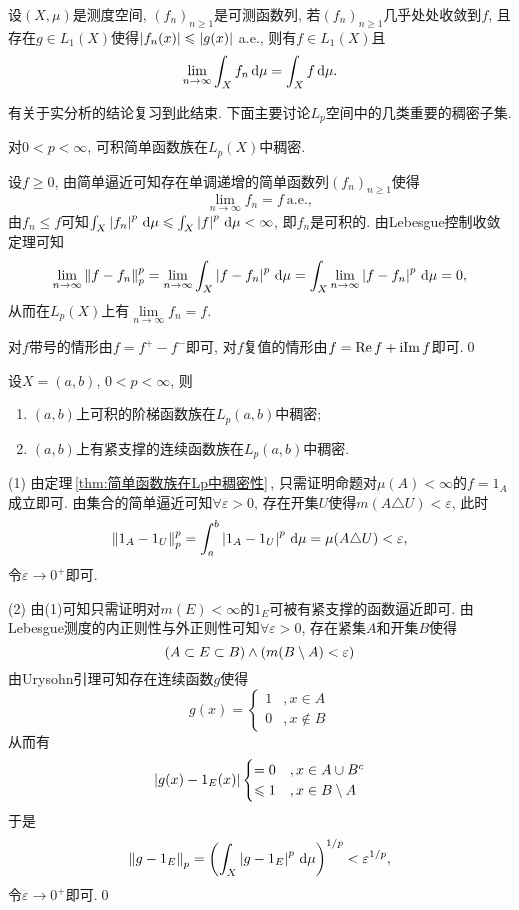 \begin{Theorem}[Lebesgue控制收敛定理]
	设$ (X,\mu) $是测度空间, $ (f_n)_{n\geqslant 1} $是可测函数列, 若$ (f_n)_{n\geqslant 1} $几乎处处收敛到$ f $, 且存在$ g\in L_1(X) $使得$ \left| f_n(x) \right| \leqslant\left| g(x) \right|  $ a.e., 则有$ f\in L_1(X) $且
	\[
		\lim_{n\to\infty}\int_Xf_n\,\mathrm{d}\mu=\int_Xf\,\mathrm{d}\mu.
	\]
\end{Theorem}

有关于实分析的结论复习到此结束. 下面主要讨论$ L_p $空间中的几类重要的稠密子集.

\begin{Theorem}\label{thm:简单函数族在Lp中稠密性}
	对$ 0<p<\infty $, 可积简单函数族在$ L_p(X) $中稠密.
\end{Theorem}
\begin{Proof}
	设$ f\geqslant 0 $, 由简单逼近可知存在单调递增的简单函数列$ (f_n)_{n\geqslant 1} $使得
	\[
		\lim_{n\to\infty}f_n=f\ \text{a.e.},
	\]
	由$ f_n\leqslant f $可知$ \int_X\left| f_n \right| ^p\,\mathrm{d}\mu\leqslant\int_X\left| f \right| ^p\,\mathrm{d}\mu<\infty $, 即$ f_n $是可积的. 由Lebesgue控制收敛定理可知
	\[
		\lim_{n\to\infty}\left\| f-f_n \right\|_p^p=\lim_{n\to\infty}\int_X\left| f-f_n \right| ^p\,\mathrm{d}\mu=\int_X\lim_{n\to\infty}\left| f-f_n \right| ^p\,\mathrm{d}\mu=0,
	\]
	从而在$ L_p(X) $上有$ \lim\limits_{n\to\infty}f_n=f $.

	对$ f $带号的情形由$ f=f^+-f^- $即可, 对$ f $复值的情形由$ f=\mathrm{Re\,} f+\mathrm{i}\mathrm{Im\,} f $即可.\qed
\end{Proof}

\begin{Corollary}
	设$ X=(a,b) $, $ 0<p<\infty $, 则
	\begin{enumerate}[(1)]
		\item $ (a,b) $上可积的阶梯函数族在$ L_p(a,b) $中稠密;
		\item $ (a,b) $上有紧支撑的连续函数族在$ L_p(a,b) $中稠密.
	\end{enumerate}
\end{Corollary}
\begin{Proof}
	(1) 由定理\,\ref{thm:简单函数族在Lp中稠密性}\,, 只需证明命题对$ \mu(A)<\infty $的$ f=1_A $成立即可. 由集合的简单逼近可知$ \forall\varepsilon>0 $, 存在开集$ U $使得$ m(A\triangle U)<\varepsilon $, 此时
	\[
		\left\| 1_A-1_U \right\|_p^p=\int_a^b\left| 1_A-1_U \right| ^p\,\mathrm{d}\mu=\mu(A\triangle U)<\varepsilon,
	\]
	令$ \varepsilon\to 0^+ $即可.

	(2) 由(1)可知只需证明对$ m(E)<\infty $的$ 1_E $可被有紧支撑的函数逼近即可. 由Lebesgue测度的内正则性与外正则性可知$ \forall\varepsilon>0 $, 存在紧集$ A $和开集$ B $使得
	\[
		(A\subset E\subset B)\land(m(B\setminus A)<\varepsilon)
	\]
	由Urysohn引理可知存在连续函数$ g $使得
	\[
		g(x)=\begin{cases}
			1 & ,x\in A \\0 & ,x\notin B
		\end{cases}
	\]
	从而有
	\[
		\left| g(x)-1_E(x) \right| \begin{cases}
			=0 & ,x\in A\cup B^c \\\leqslant 1 & ,x\in B\setminus A
		\end{cases}
	\]
	于是
	\[
		\left\| g-1_E \right\|_p=\left(\int_X\left| g-1_E \right| ^p\,\mathrm{d}\mu\right)^{1/p}<\varepsilon^{1/p},
	\]
	令$ \varepsilon\to 0^+ $即可.\qed
\end{Proof}

